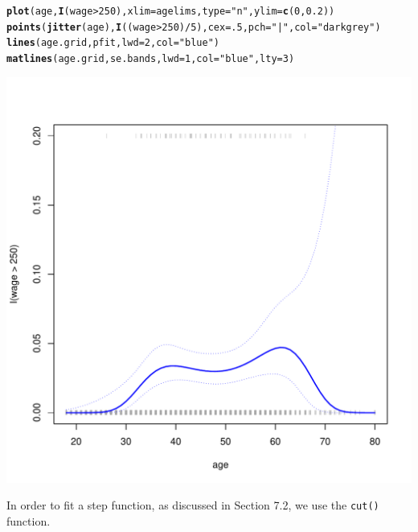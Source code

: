 \documentclass[12pt]{article}\usepackage[]{graphicx}\usepackage[]{color}
\makeatletter
\def\maxwidth{ %
  \ifdim\Gin@nat@width>\linewidth
    \linewidth
  \else
    \Gin@nat@width
  \fi
}
\newcommand{\hlnum}[1]{\textcolor[rgb]{0.686,0.059,0.569}{#1}}%
\newcommand{\hlstr}[1]{\textcolor[rgb]{0.192,0.494,0.8}{#1}}%
\newcommand{\hlopt}[1]{\textcolor[rgb]{0,0,0}{#1}}%
\newcommand{\hlstd}[1]{\textcolor[rgb]{0.345,0.345,0.345}{#1}}%
\newcommand{\hlkwc}[1]{\textcolor[rgb]{0.333,0.667,0.333}{#1}}%
\newcommand{\hlkwd}[1]{\textcolor[rgb]{0.737,0.353,0.396}{\textbf{#1}}}%
\newenvironment{kframe}{%
 \def\at@end@of@kframe{}%
 \ifinner\ifhmode%
  \def\at@end@of@kframe{\end{minipage}}%
  \begin{minipage}{\columnwidth}%
 \fi\fi%
 \def\FrameCommand##1{\hskip\@totalleftmargin \hskip-\fboxsep
 \colorbox{shadecolor}{##1}\hskip-\fboxsep
     \hskip-\linewidth \hskip-\@totalleftmargin \hskip\columnwidth}%
 \MakeFramed {\advance\hsize-\width
   \@totalleftmargin\z@ \linewidth\hsize
   \@setminipage}}%
 {\par\unskip\endMakeFramed%
 \at@end@of@kframe}
\newenvironment{knitrout}{}{} %
\makeatother
\begin{document}
\begin{knitrout}
\color{fgcolor}\begin{kframe}
\begin{alltt}
\hlkwd{plot}\hlstd{(age,}\hlkwd{I}\hlstd{(wage}\hlopt{>}\hlnum{250}\hlstd{),} \hlkwc{xlim}\hlstd{=agelims,} \hlkwc{type}\hlstd{=}\hlstr{"n"}\hlstd{,} \hlkwc{ylim}\hlstd{=}\hlkwd{c}\hlstd{(}\hlnum{0}\hlstd{,}\hlnum{0.2}\hlstd{))}
\hlkwd{points}\hlstd{(}\hlkwd{jitter}\hlstd{(age),} \hlkwd{I}\hlstd{((wage}\hlopt{>}\hlnum{250}\hlstd{)}\hlopt{/}\hlnum{5}\hlstd{),} \hlkwc{cex}\hlstd{=}\hlnum{.5}\hlstd{,} \hlkwc{pch}\hlstd{=}\hlstr{"|"}\hlstd{,} \hlkwc{col}\hlstd{=}\hlstr{"darkgrey"}\hlstd{)}
\hlkwd{lines}\hlstd{(age.grid, pfit,} \hlkwc{lwd}\hlstd{=}\hlnum{2}\hlstd{,} \hlkwc{col}\hlstd{=}\hlstr{"blue"}\hlstd{)}
\hlkwd{matlines}\hlstd{(age.grid, se.bands,} \hlkwc{lwd}\hlstd{=}\hlnum{1}\hlstd{,} \hlkwc{col}\hlstd{=}\hlstr{"blue"}\hlstd{,} \hlkwc{lty}\hlstd{=}\hlnum{3}\hlstd{)}
\end{alltt}
\end{kframe}
\includegraphics[width=\maxwidth]{figure/unnamed-chunk-15-1} 

\end{knitrout}

In order to fit a step function, as discussed in Section 7.2, we use the \texttt{cut()} function.
\end{document}
